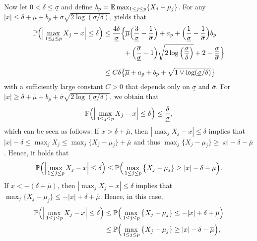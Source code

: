 \documentclass[a4paper,12pt]{article}
\makeatletter
\renewcommand{\eqref}[1]{\tagform@{\ref{#1}}}
\makeatother
\begin{document}
Now let $0 < \delta \le \underline{\sigma}$ and define $b_p = \mathbb{E} \max_{1 \le j \le p} \{X_j - \mu_j\}$. For any $|x| \le \delta + \overline{\mu} + b_p + \overline{\sigma} \sqrt{2\log(\underline{\sigma}/\delta)}$, \eqref{eq-bound1-Levy} yields that 
\begin{align}
\pr \Big( \Big| \max_{1 \le j \le p} X_j - x \Big| \le \delta \Big) 
 & \le \frac{4 \delta}{\underline{\sigma}} \Big\{ \overline{\mu} \Big( \frac{3}{\underline{\sigma}} - \frac{1}{\overline{\sigma}} \Big) + a_p + \Big( \frac{1}{\underline{\sigma}} - \frac{1}{\overline{\sigma}} \Big) b_p \nonumber \\ & \phantom{\le \frac{4 \delta}{\underline{\sigma}} \Big\{} + \Big( \frac{\overline{\sigma}}{\underline{\sigma}} - 1 \Big) \sqrt{2\log\Big(\frac{\underline{\sigma}}{\delta}\Big)} + 2 - \frac{\underline{\sigma}}{\overline{\sigma}} \Big\} \nonumber \\[0.2cm]
 & \le C \delta \big\{ \overline{\mu} + a_p + b_p + \sqrt{1 \vee \log(\underline{\sigma}/\delta)} \big\} \label{eq-bound2-Levy}
\end{align}
with a sufficiently large constant $C > 0$ that depends only on $\underline{\sigma}$ and $\overline{\sigma}$. For $|x| \ge \delta + \overline{\mu} + b_p + \overline{\sigma}\sqrt{2\log(\underline{\sigma}/\delta)}$, we obtain that 
\begin{equation}\label{eq-bound3-Levy}
\mathbb{P} \Big( \Big| \max_{1 \le j \le p} X_j - x \Big| \le \delta \Big) \le \frac{\delta}{\underline{\sigma}}, 
\end{equation}
which can be seen as follows: If $x > \delta + \overline{\mu}$, then $|\max_j X_j - x| \le \delta$ implies that $|x| - \delta \le \max_j X_j \le \max_j \{ X_j - \mu_j \} + \overline{\mu}$ and thus $\max_j \{ X_j - \mu_j \} \ge |x| - \delta - \overline{\mu}$. Hence, it holds that 
\begin{equation}\label{eq-bound3-Levy-prep1}
\mathbb{P} \Big( \Big| \max_{1 \le j \le p} X_j - x \Big| \le \delta \Big) \le \mathbb{P} \Big( \max_{1 \le j \le p} \big\{ X_j - \mu_j \} \ge |x| - \delta - \overline{\mu} \Big). 
\end{equation}
If $x < - (\delta + \overline{\mu})$, then $|\max_j X_j - x| \le \delta$ implies that $\max_j \{ X_j - \mu_j \} \le -|x| + \delta + \overline{\mu}$. Hence, in this case,
\begin{align}
\mathbb{P} \Big( \Big| \max_{1 \le j \le p} X_j - x \Big| \le \delta \Big) 
 & \le \mathbb{P} \Big( \max_{1 \le j \le p} \big\{ X_j - \mu_j \} \le -|x| + \delta + \overline{\mu} \Big) \nonumber \\
 & \le \mathbb{P} \Big( \max_{1 \le j \le p} \big\{ X_j - \mu_j \} \ge |x| - \delta - \overline{\mu} \Big), \label{eq-bound3-Levy-prep2}
\end{align}
\end{document}
